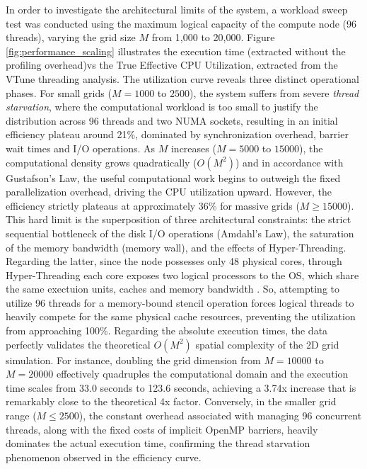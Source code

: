 In order to investigate the architectural limits of the system, a workload sweep test was conducted using the maximum logical capacity of the compute node (96 threads), varying the grid size $M$ from 1,000 to 20,000. Figure \ref{fig:performance_scaling} illustrates the execution time (extracted without the profiling overhead)vs the True Effective CPU Utilization, extracted from the VTune threading analysis.
The utilization curve reveals three distinct operational phases. For small grids ($M=1000$ to $2500$), the system suffers from severe \textit{thread starvation}, 
where the computational workload is too small to justify the distribution across 96 threads and two NUMA sockets, resulting in an initial efficiency plateau around 21\%, dominated by synchronization overhead, barrier wait times and I/O operations.
As $M$ increases ($M=5000$ to $15000$), the computational density grows quadratically ($O(M^2)$) and in accordance with Gustafson's Law, the useful computational work begins to outweigh the fixed parallelization overhead, driving the CPU utilization upward.
However, the efficiency strictly plateaus at approximately 36\% for massive grids ($M \ge 15000$). This hard limit is the superposition of three architectural constraints: 
the strict sequential bottleneck of the disk I/O operations (Amdahl's Law), the saturation of the memory bandwidth (memory wall), and the effects of Hyper-Threading. Regarding the latter, since the node possesses only 48 physical cores, through Hyper-Threading each core exposes two logical processors to the OS, which share the same exectuion units, caches and memory bandwidth \cite{marr2002hyperthreading}. So, attempting to utilize 96 threads for a memory-bound stencil operation forces logical threads to heavily compete for the same physical cache resources, preventing the utilization from approaching 100\%.
Regarding the absolute execution times, the data perfectly validates the theoretical $O(M^2)$ spatial complexity of the 2D grid simulation. For instance, doubling the grid dimension from $M=10000$ to $M=20000$ effectively quadruples the computational domain and the execution time scales from 33.0 seconds to 123.6 seconds, achieving a 3.74x increase that is remarkably close to the theoretical 4x factor. Conversely, in the smaller grid range ($M \le 2500$), the constant overhead associated with managing 96 concurrent threads, along with the fixed costs of implicit OpenMP barriers, heavily dominates the actual execution time, confirming the thread starvation phenomenon observed in the efficiency curve.
